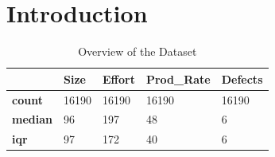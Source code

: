 \documentclass[sigconf,review]{acmart}
\begin{document}
\section{Introduction}


\begin{table}
\centering
\caption{Overview of the Dataset}
\label{tab:overview}
\begin{tabular}{|l|l|l|l|l|}
\hline
\textbf{}       & \textbf{Size} & \textbf{Effort} & \textbf{Prod\_Rate} & \textbf{Defects} \\ \hline
\textbf{count}  & 16190       & 16190         & 16190             & 16190          \\ \hline
\textbf{median} & 96          & 197           & 48                & 6              \\ \hline
\textbf{iqr}    & 97          & 172           & 40                & 6             \\ \hline
\end{tabular}
\end{table}
\end{document}
